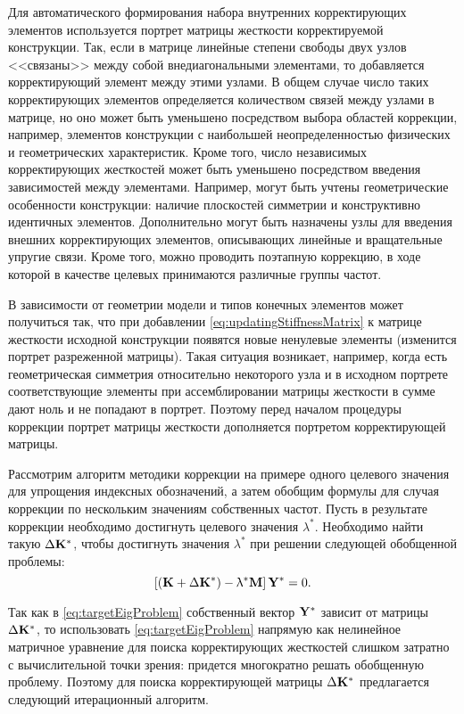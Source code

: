 Для автоматического формирования набора внутренних корректирующих элементов используется портрет матрицы жесткости корректируемой конструкции. Так, если в матрице линейные степени свободы двух узлов <<связаны>> между собой внедиагональными элементами, то добавляется корректирующий элемент между этими узлами. В общем случае число таких корректирующих элементов определяется количеством связей между узлами в матрице, но оно может быть уменьшено посредством выбора областей коррекции, например, элементов конструкции с наибольшей неопределенностью физических и геометрических характеристик. Кроме того, число независимых корректирующих жесткостей может быть уменьшено посредством введения зависимостей между элементами. Например, могут быть учтены геометрические особенности конструкции: наличие плоскостей симметрии и конструктивно идентичных элементов. Дополнительно могут быть назначены узлы для введения внешних корректирующих элементов, описывающих линейные и вращательные упругие связи. Кроме того, можно проводить поэтапную коррекцию, в ходе которой в качестве целевых принимаются различные группы частот.

В зависимости от геометрии модели и типов конечных элементов может получиться так, что при добавлении \eqref{eq:updatingStiffnessMatrix} к матрице жесткости исходной конструкции появятся новые ненулевые элементы (изменится портрет разреженной матрицы). Такая ситуация возникает, например, когда есть геометрическая симметрия относительно некоторого узла и в исходном портрете соответствующие элементы при ассемблировании матрицы жесткости в сумме дают ноль и не попадают в портрет. Поэтому перед началом процедуры коррекции портрет матрицы жесткости дополняется портретом корректирующей матрицы.

Рассмотрим алгоритм методики коррекции на примере одного целевого значения для упрощения индексных обозначений, а затем обобщим формулы для случая коррекции по нескольким значениям собственных частот. Пусть в результате коррекции необходимо достигнуть целевого значения $ \lambda ^ \ast $. Необходимо найти такую $ \Delta \mathbf{K} ^ \ast $, чтобы достигнуть значения $ \lambda ^ \ast $ при решении следующей обобщенной проблемы:
\begin{equation}
	\left[ \left( \mathbf{K} + \Delta \mathbf{K} ^ \ast \right) - \uplambda ^ \ast \mathbf{M} \right] \mathbf{Y} ^ \ast = 0.
	\label{eq:targetEigProblem}
\end{equation}

Так как в \eqref{eq:targetEigProblem} собственный вектор $ \mathbf{Y} ^ \ast $ зависит от матрицы $ \Delta \mathbf{K} ^ \ast $, то использовать \eqref{eq:targetEigProblem} напрямую как нелинейное матричное уравнение для поиска корректирующих жесткостей слишком затратно с вычислительной точки зрения: придется многократно решать обобщенную проблему. Поэтому для поиска корректирующей матрицы $ \Delta \mathbf{K} ^ \ast $ предлагается следующий итерационный алгоритм.

